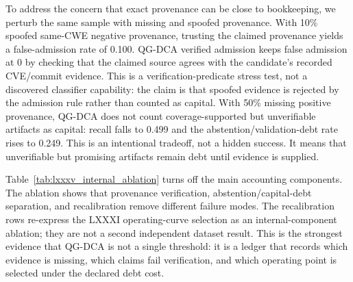 ﻿\documentclass[lettersize,journal]{IEEEtran}
\begin{document}
\begin{table}[!t]
\caption{LXXXIII external component ablation on MegaVul same-CWE controls}
\label{tab:lxxxiii_component_ablation}
\centering
\scriptsize
\renewcommand{\arraystretch}{1.12}
\end{table}

To address the concern that exact provenance can be close to bookkeeping, we perturb the same sample with missing and spoofed provenance. With 10\% spoofed same-CWE negative provenance, trusting the claimed provenance yields a false-admission rate of 0.100. QG-DCA verified admission keeps false admission at 0 by checking that the claimed source agrees with the candidate's recorded CVE/commit evidence. This is a verification-predicate stress test, not a discovered classifier capability: the claim is that spoofed evidence is rejected by the admission rule rather than counted as capital. With 50\% missing positive provenance, QG-DCA does not count coverage-supported but unverifiable artifacts as capital: recall falls to 0.499 and the abstention/validation-debt rate rises to 0.249. This is an intentional tradeoff, not a hidden success. It means that unverifiable but promising artifacts remain debt until evidence is supplied.

Table~\ref{tab:lxxxv_internal_ablation} turns off the main accounting components. The ablation shows that provenance verification, abstention/capital-debt separation, and recalibration remove different failure modes. The recalibration rows re-express the LXXXI operating-curve selection as an internal-component ablation; they are not a second independent dataset result. This is the strongest evidence that QG-DCA is not a single threshold: it is a ledger that records which evidence is missing, which claims fail verification, and which operating point is selected under the declared debt cost.
\end{document}
